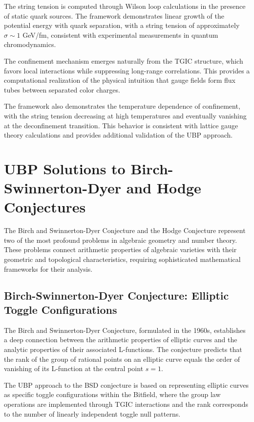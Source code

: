 \documentclass[11pt]{amsart}
\begin{document}
The string tension is computed through Wilson loop calculations in the presence of static quark sources. The framework demonstrates linear growth of the potential energy with quark separation, with a string tension of approximately $\sigma \sim 1$ GeV/fm, consistent with experimental measurements in quantum chromodynamics.

The confinement mechanism emerges naturally from the TGIC structure, which favors local interactions while suppressing long-range correlations. This provides a computational realization of the physical intuition that gauge fields form flux tubes between separated color charges.

The framework also demonstrates the temperature dependence of confinement, with the string tension decreasing at high temperatures and eventually vanishing at the deconfinement transition. This behavior is consistent with lattice gauge theory calculations and provides additional validation of the UBP approach.

\section{UBP Solutions to Birch-Swinnerton-Dyer and Hodge Conjectures}

The Birch and Swinnerton-Dyer Conjecture and the Hodge Conjecture represent two of the most profound problems in algebraic geometry and number theory. These problems connect arithmetic properties of algebraic varieties with their geometric and topological characteristics, requiring sophisticated mathematical frameworks for their analysis.

\subsection{Birch-Swinnerton-Dyer Conjecture: Elliptic Toggle Configurations}

The Birch and Swinnerton-Dyer Conjecture, formulated in the 1960s, establishes a deep connection between the arithmetic properties of elliptic curves and the analytic properties of their associated L-functions. The conjecture predicts that the rank of the group of rational points on an elliptic curve equals the order of vanishing of its L-function at the central point $s = 1$.

The UBP approach to the BSD conjecture is based on representing elliptic curves as specific toggle configurations within the Bitfield, where the group law operations are implemented through TGIC interactions and the rank corresponds to the number of linearly independent toggle null patterns.
\end{document}
